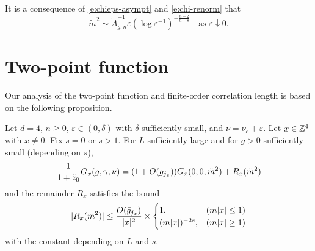\begin{rk}
It is a consequence of \eqref{e:chieps-asympt} and \eqref{e:chi-renorm} that
\begin{equation}
\label{e:mass-epsilon-asympt}
\tilde m^2
	\sim
\tilde A_{g,n}^{-1} \varepsilon (\log \varepsilon^{-1})^{-\frac{n + 2}{n + 8}}
	\quad
\text{as $\varepsilon \downarrow 0$}.
\end{equation}
\end{rk}


\section{Two-point function}

Our analysis of the two-point function and finite-order correlation length is
based on the following proposition.

\begin{prop}
\label{prop:R}
Let $d=4$, $n \ge 0$, $\varepsilon \in (0,\delta)$ with $\delta$ sufficiently small,
and $\nu = \nu_c + \varepsilon$.
Let $x \in {\mathbb Z}^4$ with $x \neq 0$.
Fix $s = 0$ or $s > 1$.
For $L$ sufficiently large and for $g > 0$ sufficiently small (depending on $s$),
\begin{equation}
\label{e:Gab-to-sum-Rqj}
\frac{1}{1+\tilde z_0} G_x(g, \gamma, \nu)
	=
(1 + O(\bar{g}_{j_x})) G_x(0, 0, \tilde m^2) + R_x(\tilde m^2)
\end{equation}
and the remainder $R_x$ satisfies the bound
\begin{equation}
\label{e:Rab-bound}
|R_{x}(m^2)|
	\le
\frac{O(\bar{g}_{j_{x}}) }{|x|^2}
	\times
\begin{cases}
1,				& (m|x|\le 1) \\
(m|x|)^{-2s},	& (m|x|\ge 1)
\end{cases}
\end{equation}
with the  constant depending on $L$ and $s$.
\end{prop}

